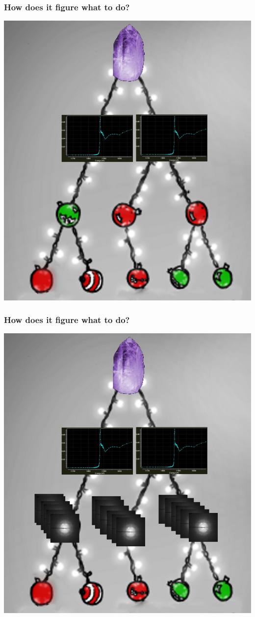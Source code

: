 \documentclass[slides,compress]{beamer}
\begin{document}
\begin{frame}
\frametitle{How does it figure what to do?}
\hspace{4cm}
\includegraphics[scale=0.25]{figures/christmas-tree-nothing-wavelength.png}
\end{frame}

\begin{frame}
\frametitle{How does it figure what to do?}
\hspace{4cm}
\includegraphics[scale=0.25]{figures/christmas-tree-nothing-sweep.png}
\end{frame}
\end{document}
